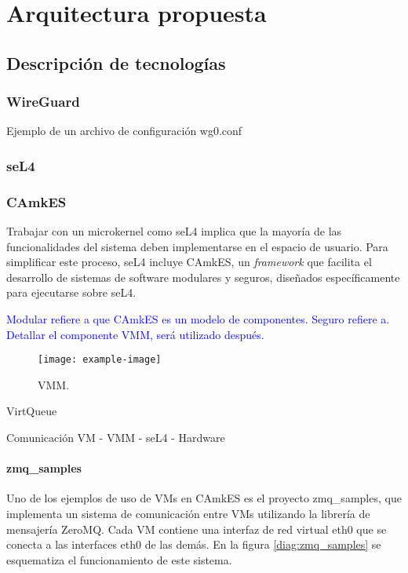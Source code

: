 \chapter{Arquitectura propuesta}
\section{Descripción de tecnologías}
\subsection{WireGuard}
Ejemplo de un archivo de configuración wg0.conf
\subsection{seL4}
\subsection{CAmkES}

Trabajar con un microkernel como seL4 implica que la mayoría de las funcionalidades del sistema deben implementarse en el espacio de usuario. Para simplificar este proceso, seL4 incluye CAmkES, un \textit{framework} que facilita el desarrollo de sistemas de software modulares y seguros, diseñados específicamente para ejecutarse sobre seL4.

\textcolor{blue}{Modular refiere a que CAmkES es un modelo de componentes. Seguro refiere a. Detallar el componente VMM, será utilizado después.}

\begin{figure}[h!]
    \centering
    \texttt{[image: example-image]}
    \caption{VMM.}
    \label{diag:camkes_vmm}
\end{figure}

VirtQueue

Comunicación VM - VMM - seL4 - Hardware

\subsubsection{zmq\_samples}
Uno de los ejemplos de uso de VMs en CAmkES es el proyecto zmq\_samples, que implementa un sistema de comunicación entre VMs utilizando la librería de mensajería ZeroMQ. Cada VM contiene una interfaz de red virtual eth0 que se conecta a las interfaces eth0 de las demás. En la figura \ref{diag:zmq_samples} se esquematiza el funcionamiento de este sistema.




